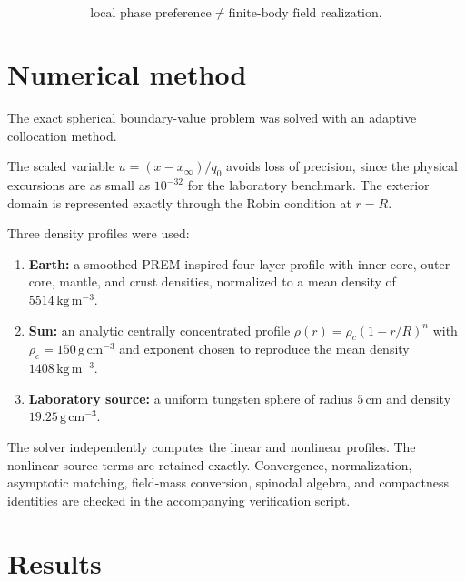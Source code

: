 \documentclass[11pt,a4paper]{article}
\providecommand{\tightlist}{\setlength{\itemsep}{0pt}\setlength{\parskip}{0pt}}
\begin{document}
\[
\boxed{
\text{local phase preference}\neq\text{finite-body field realization}.
}
\]



\section{Numerical method}\label{numerical-method}

The exact spherical boundary-value problem was solved with an adaptive
collocation method.

The scaled variable \(u=(x-x_\infty)/q_0\) avoids loss of precision,
since the physical excursions are as small as \(10^{-32}\) for the
laboratory benchmark. The exterior domain is represented exactly through
the Robin condition at \(r=R\).

Three density profiles were used:

\begin{enumerate}
\def\labelenumi{\arabic{enumi}.}
\tightlist
\item
  \textbf{Earth:} a smoothed PREM-inspired four-layer profile with
  inner-core, outer-core, mantle, and crust densities, normalized to a
  mean density of \(5514\,\mathrm{kg\,m^{-3}}\).
\item
  \textbf{Sun:} an analytic centrally concentrated profile
  \(\rho(r)=\rho_c(1-r/R)^n\) with \(\rho_c=150\,\mathrm{g\,cm^{-3}}\)
  and exponent chosen to reproduce the mean density
  \(1408\,\mathrm{kg\,m^{-3}}\).
\item
  \textbf{Laboratory source:} a uniform tungsten sphere of radius
  \(5\,\mathrm{cm}\) and density \(19.25\,\mathrm{g\,cm^{-3}}\).
\end{enumerate}

The solver independently computes the linear and nonlinear profiles. The
nonlinear source terms are retained exactly. Convergence, normalization,
asymptotic matching, field-mass conversion, spinodal algebra, and
compactness identities are checked in the accompanying verification
script.



\section{Results}\label{results}
\end{document}
